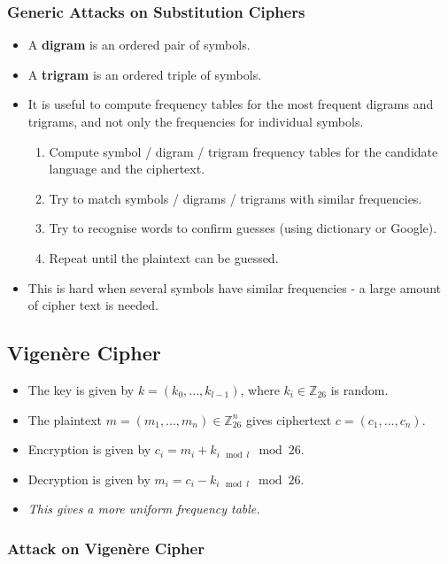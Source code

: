 \documentclass[a4paper]{scrartcl}
\begin{document}
\subsubsection*{Generic Attacks on Substitution Ciphers}

\begin{itemize}
\item A \textbf{digram} is an ordered pair of symbols.
\item A \textbf{trigram} is an ordered triple of symbols.
\item It is useful to compute frequency tables for the most frequent digrams and trigrams, and not only the frequencies for individual symbols. 

\begin{enumerate}
\item Compute symbol / digram / trigram frequency tables for the candidate language and the ciphertext.
\item Try to match symbols / digrams / trigrams with similar frequencies. 
\item Try to recognise words to confirm guesses (using dictionary or Google).
\item Repeat until the plaintext can be guessed.
\end{enumerate}
\item This is hard when several symbols have similar frequencies - a large amount of cipher text is needed.
\end{itemize}

\subsection*{Vigenère Cipher}

\begin{itemize}
\item The key is given by $k = (k_0, ..., k_{l - 1})$, where $k_i \in \mathbb{Z}_{26}$ is random.
\item The plaintext $m = (m_1, ..., m_n) \in \mathbb{Z}_{26}^{n}$ gives ciphertext $c = (c_1, ..., c_n)$.
\item Encryption is given by $c_i = m_i + k_{i \mod l} \mod 26$.
\item Decryption is given by $m_i = c_i - k_{i \mod l} \mod 26$.
\item \textsl{This gives a more uniform frequency table.}
\end{itemize}

\subsubsection*{Attack on Vigenère Cipher}
\end{document}
